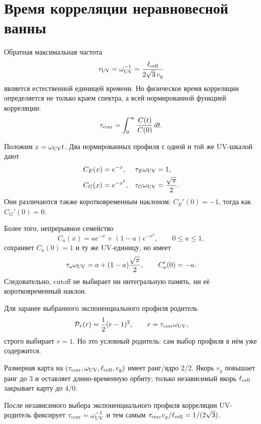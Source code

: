 \chapter{Время корреляции неравновесной ванны}
\label{ch:v10-nonequilibrium-bath-correlation-time}

Обратная максимальная частота
\begin{equation}
 \tau_{\rm UV}=\omega_{\rm UV}^{-1}
 =\frac{\ell_{\rm cell}}{2\sqrt3\,v_g}
\end{equation}
является естественной единицей времени. Но физическое время корреляции
определяется не только краем спектра, а всей нормированной функцией
корреляции:
\begin{equation}
 \tau_{\rm corr}=\int_0^\infty
 \frac{C(t)}{C(0)}\,dt.
\end{equation}

Положим $x=\omega_{\rm UV}t$. Два нормированных профиля с одной и той же
UV-шкалой дают
\begin{align}
 C_E(x)&=e^{-x}, & \tau_E\omega_{\rm UV}&=1,\\
 C_G(x)&=e^{-x^2}, & \tau_G\omega_{\rm UV}&=\frac{\sqrt\pi}{2}.
\end{align}
Они различаются также коротковременным наклоном:
$C_E'(0)=-1$, тогда как $C_G'(0)=0$.

Более того, непрерывное семейство
\begin{equation}
 C_a(x)=a e^{-x}+(1-a)e^{-x^2},\qquad 0\leq a\leq1,
\end{equation}
сохраняет $C_a(0)=1$ и ту же UV-единицу, но имеет
\begin{equation}
 \tau_a\omega_{\rm UV}
 =a+(1-a)\frac{\sqrt\pi}{2},
 \qquad C_a'(0)=-a.
\end{equation}
Следовательно, cutoff не выбирает ни интегральную память, ни её
коротковременный наклон.

Для заранее выбранного экспоненциального профиля родитель
\begin{equation}
 \mathcal P_\tau(r)=\frac12(r-1)^2,
 \qquad r=\tau_{\rm corr}\omega_{\rm UV},
\end{equation}
строго выбирает $r=1$. Но это условный родитель: сам выбор профиля в нём
уже содержится.

Размерная карта на
$(\tau_{\rm corr},\omega_{\rm UV},\ell_{\rm cell},v_g)$ имеет ранг/ядро
$2/2$. Якорь $v_g$ повышает ранг до $3$ и оставляет длино-временную орбиту;
только независимый якорь $\ell_{\rm cell}$ закрывает карту до $4/0$.

\begin{theorem}
После независимого выбора экспоненциального профиля корреляции UV-родитель
фиксирует $\tau_{\rm corr}=\omega_{\rm UV}^{-1}$ и тем самым
$\tau_{\rm corr}v_g/\ell_{\rm cell}=1/(2\sqrt3)$.
\end{theorem}

